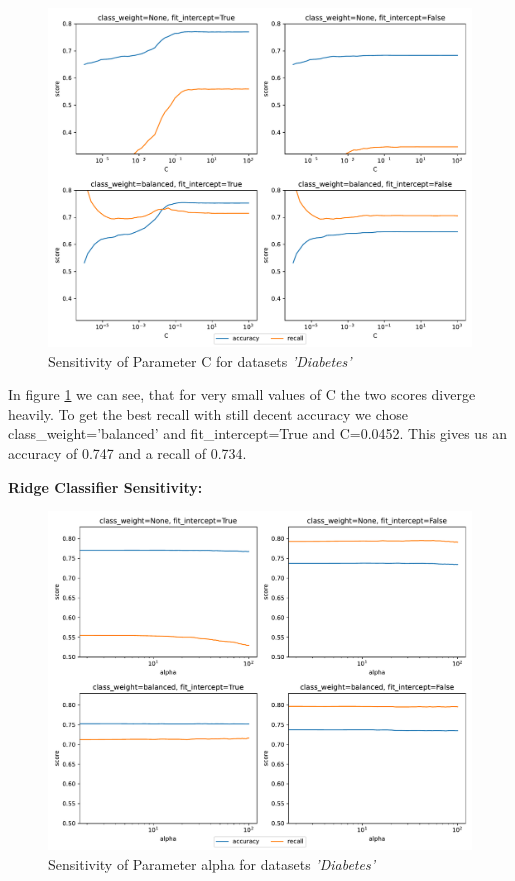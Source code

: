 \documentclass[a4paper,12pt]{article}
\begin{document}
\begin{figure}[h!]
    \centering
    \includegraphics[width=\textwidth]{diabetes/plots/linearsvc_parameter_sensitivity.pdf}
    \caption{Sensitivity of Parameter C for datasets \textit{'Diabetes'}}
    \label{fig:sensitivity svc diabetes}
    \end{figure}
    

In figure \ref{fig:sensitivity svc diabetes} we can see, that for very small values of \textsf{C} the two scores diverge heavily. To get the best recall with still decent accuracy we chose \textsf{class\_weight}=\textsf{'balanced'} and \textsf{fit\_intercept}=\textsf{True} and \textsf{C}=0.0452. This gives us an accuracy of 0.747 and a recall of 0.734.%

\textbf{Ridge Classifier Sensitivity:}

\begin{figure}[h!]
    \centering
    \includegraphics[width=\textwidth]{diabetes/plots/ridge_parameter_sensitivity.pdf}
    \caption{Sensitivity of Parameter alpha for datasets \textit{'Diabetes'}}
    \label{fig:sensitivity ridge diabetes}
    \end{figure}
\end{document}
